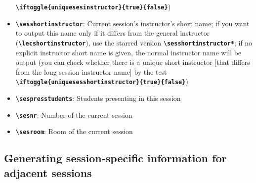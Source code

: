 \documentclass[english]{article}
\newcommand*\jmacro[1]{\textbf{\texttt{#1}}}
\newcommand*\jcsmacro[1]{\jmacro{\textbackslash{#1}}}
\newcommand*\jparam[1]{\angus #1\angud}
\begin{document}
\begin{itemize}
\jcsmacro{iftoggle\{uniquesesinstructor\}\{\jparam{true}\}\{\jparam{false}\}})
\item \jcsmacro{sesshortinstructor}: Current session's instructor's short name; if you want to output this name only if it differs from the general instructor (\jcsmacro{lecshortinstructor}), use the starred version \jcsmacro{sesshortinstructor*}; if no explicit instructor short name is given, the normal instructor name will be output (you can check whether
there is a unique short instructor [that differs from the long session instructor name] by the test
\jcsmacro{iftoggle\{uniquesesshortinstructor\}\{\jparam{true}\}\{\jparam{false}\}})
\item \jcsmacro{sespresstudents}: Students presenting in this session
\item \jcsmacro{sesnr}: Number of the current session
\item \jcsmacro{sesroom}: Room of the current session
\end{itemize}

\subsection{Generating session-specific information for adjacent sessions}
\end{document}
